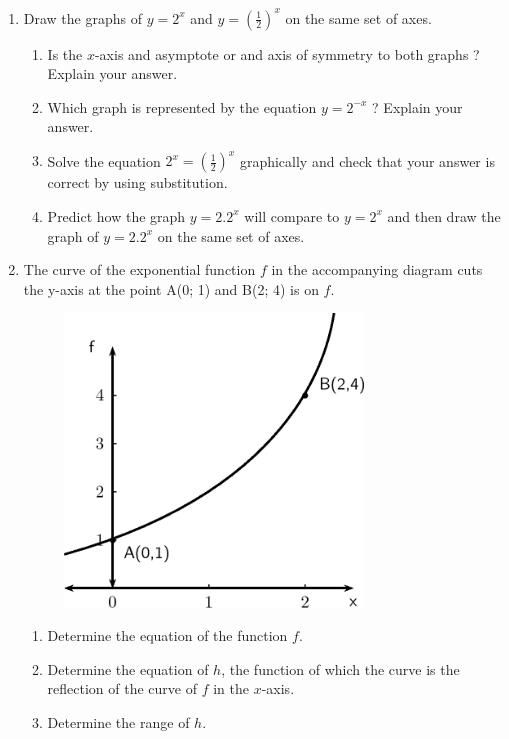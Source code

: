 \label{m39348*id253033}\begin{enumerate}[noitemsep, label=\textbf{\arabic*}. ] 
\label{m39348*uid197}\item Draw the graphs of $y={2}^{x}$ and $y={\left(\frac{1}{2}\right)}^{x}$ on the same set of axes.
\label{m39348*id253098}\begin{enumerate}[noitemsep, label=\textbf{\alph*}. ] 
\label{m39348*uid198}\item Is the $x$-axis and asymptote or and axis of symmetry to both graphs ? Explain your answer.
\label{m39348*uid199}\item Which graph is represented by the equation $y={2}^{-x}$ ? Explain your answer.
\label{m39348*uid200}\item Solve the equation ${2}^{x}={\left(\frac{1}{2}\right)}^{x}$ graphically and check that your answer is correct by using substitution.
\label{m39348*uid201}\item Predict how the graph $y=2.{2}^{x}$ will compare to $y={2}^{x}$ and then draw the graph of $y=2.{2}^{x}$ on the same set of axes.
\end{enumerate}
  \label{m39348*uid202}\item The curve of the exponential function $f$ in the accompanying diagram cuts the y-axis at the point A(0; 1) and B(2; 4) is on $f$.
\setcounter{subfigure}{0}
\begin{figure}[H] %
\begin{center}
\label{m39348*id253318!!!underscore!!!media}\label{m39348*id253318!!!underscore!!!printimage}\includegraphics[width=300px]{col11306.imgs/m39348_MG10C11_033.png} %
\vspace{2pt}
\vspace{.1in}
\end{center}
\end{figure}       \label{m39348*id253324}\begin{enumerate}[noitemsep, label=\textbf{\alph*}. ] 
\label{m39348*uid203}\item Determine the equation of the function $f$.
\label{m39348*uid204}\item Determine the equation of $h$, the function of which the curve is the reflection of the curve of $f$ in the $x$-axis.
\label{m39348*uid205}\item Determine the range of $h$.
\end{enumerate}
  \end{enumerate}
